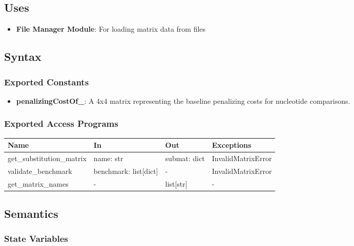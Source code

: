 \documentclass[12pt, titlepage]{article}
\begin{document}
\subsection{Uses}

\begin{itemize}
    \item \textbf{File Manager Module}: For loading matrix data from files
\end{itemize}

\subsection{Syntax}

\subsubsection{Exported Constants}

\begin{itemize}
    \item \textbf{penalizingCostOf\_}: A 4x4 matrix representing the baseline penalizing costs for nucleotide comparisons.
\end{itemize}

\subsubsection{Exported Access Programs}

\begin{center}
\begin{tabular}{p{4cm} p{4cm} p{3cm} p{2cm}}
\hline
\textbf{Name} & \textbf{In} & \textbf{Out} & \textbf{Exceptions} \\
\hline
get\_substitution\_matrix & name: str & submat: dict & InvalidMatrixError \\
validate\_benchmark & benchmark: list[dict] & - & InvalidMatrixError \\
get\_matrix\_names & - & list[str] & - \\
\hline
\end{tabular}
\end{center}

\subsection{Semantics}

\subsubsection{State Variables}
\end{document}
